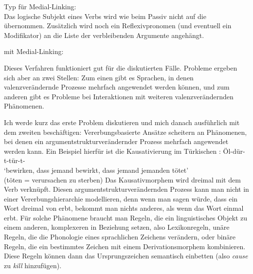 \eas\label{constr-middle-linking}%
Typ für Medial-Linking:\\
\zs
Das logische Subjekt eines Verbs wird wie beim Passiv
nicht auf die \compsl übernommen. Zusätzlich wird noch ein Reflexivpronomen
(und eventuell ein Modifikator) an die Liste der verbleibenden Argumente 
angehängt.

\eas
{} mit Medial-Linking:\\
\zs

\noindent
Dieses Verfahren funktioniert gut für die diskutierten Fälle. Probleme ergeben sich aber
an zwei Stellen: Zum einen gibt es Sprachen, in denen valenzverändernde Prozesse mehrfach
angewendet werden können, und zum anderen gibt es Probleme bei Interaktionen mit weiteren valenzverändernden Phänomenen.

Ich werde kurz das erste Problem diskutieren und mich danach ausführlich mit
dem zweiten beschäftigen: Vererbungsbasierte Ansätze scheitern an Phänomenen, bei denen ein argumentstrukturverändernder
Prozess mehrfach angewendet werden kann. Ein Beispiel hierfür ist die Kausativierung im Türkischen
\citep{Lewis67a-u}: 
\ea
Öl-dür-t-tür-t- \\
`bewirken, dass jemand bewirkt, dass jemand jemanden tötet'\\
(töten = verursachen zu sterben)
\z
Das Kausativmorphem  wird dreimal mit dem Verb verknüpft. Diesen argumentstrukturverändernden
Prozess kann man nicht in einer Vererbungshierarchie modellieren, denn wenn man sagen würde, dass
ein Wort dreimal von  erbt, bekommt man nichts anderes, als wenn das Wort
einmal erbt. Für solche Phänomene braucht man Regeln, die ein
linguistisches Objekt zu einem anderen, komplexeren in Beziehung setzen, also Lexikonregeln, unäre
Regeln, die die Phonologie eines sprachlichen Zeichens verändern, oder binäre Regeln, die ein
bestimmtes Zeichen mit einem Derivationsmorphem kombinieren. Diese Regeln können dann das
Ursprungszeichen semantisch einbetten (also \zb \emph{cause} zu \emph{kill} hinzufügen). 

